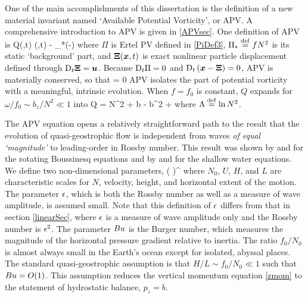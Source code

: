 \documentclass[12pt, oneside]{book}
\begin{document}
One of the main accomplishments of this dissertation is the definition of a new material invariant named `Available Potential Vorticity', or APV.  A comprehensive introduction to APV is given in \ch \ref{APVsec}.  One definition of APV is 
\beq
Q(\bx,t)  \Pi(\bx,t) - \Pi_*(\bx-\bXi) \com
\label{APVdef}
\eeq
where $\Pi$ is Ertel PV defined in \eqref{PiDef3}, $\Pi_* \stackrel{\mathrm{def}}{=} f N^2$ is its static `background' part, and $\boldsymbol {\Xi}(\boldsymbol x,t)$ is exact nonlinear particle displacement defined through $\mathrm{D}_t \boldsymbol {\Xi} = \boldsymbol u$.  Because $\mathrm{D}_t \Pi = 0$ and $\mathrm{D}_t \left ( \boldsymbol x - \boldsymbol {\Xi} \right ) = 0$, APV is materially conserved, so that
\beq
{} = 0 \per
\eeq
APV isolates the part of potential vorticity with a meaningful, intrinsic evolution.  When $f=f_0$ is constant, $Q$ expands for $\omega / f_0 \sim b_z / N^2 \ll 1$ into
\beq
Q = N^2  + \bomega \bcdot \bnabla b -  \half b^2 + \cdots \com
\eeq
where $\Lambda \stackrel{\mathrm{def}}{=} \ln N^2$. 

The APV equation opens a relatively straightforward path to the result that the evolution of quasi-geostrophic flow is independent from waves \textit{of equal `magnitude'} to leading-order in Rossby number.  This result was shown by \cite{bartello1995geostrophic} and \cite{majda1998averaging} for the rotating Boussinesq equations and by \cite{warn1986statistical} and \cite{dewar1995fast} for the shallow water equations.   We define two non-dimensional parameters, 
\beq
\ep {} {} \com \qquad {} \qquad \Bu {} \left (  \right )^{\! } \com
\eeq
where $N_0$, $U$, $H$, and $L$ are characteristic scales for $N$, velocity, height, and horizontal extent of the motion.  The parameter $\epsilon$, which is both the Rossby number as well as a measure of wave amplitude, is assumed small.  Note that this definition of $\epsilon$ differs from that in section \ref{linearSec}, where $\epsilon$ is a measure of wave amplitude only and the Rossby number is $\epsilon^2$.  The parameter $Bu$ is the Burger number, which measures the magnitude of the horizontal pressure gradient relative to inertia.  The ratio $f_0 / N_0$ is almost always small in the Earth's ocean except for isolated, abyssal places.  The standard quasi-geostrophic assumption is that $H / L \sim f_0 / N_0 \ll 1$ such that $Bu = O(1)$.  This assumption reduces the vertical momentum equation \eqref{zmom} to the statement of hydrostatic balance, $p_z = b$.
\end{document}
